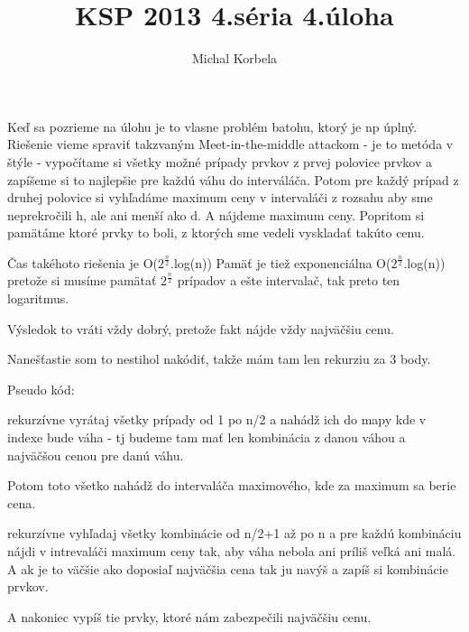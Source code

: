 \documentclass[a4paper,11pt]{article}
\title{KSP 2013 4.séria 4.úloha}
\author{Michal Korbela}
\begin{document}
Keď sa pozrieme na úlohu je to vlasne problém batohu, ktorý je np úplný.
Riešenie vieme spraviť takzvaným Meet-in-the-middle attackom - je to metóda v štýle - vypočítame si všetky možné prípady prvkov z prvej polovice prvkov a zapíšeme si to najlepšie pre každú váhu do interváláča. Potom pre každý prípad z druhej polovice si vyhľadáme maximum ceny v intervaláči z rozsahu aby sme neprekročili h, ale ani menší ako d.
A nájdeme maximum ceny. Popritom si pamätáme ktoré prvky to boli, z ktorých sme vedeli vyskladať takúto cenu.

Čas takéhoto riešenia je O($2^{\frac{n}{2}}$.log(n))
Pamäť je tiež exponenciálna O($2^{\frac{n}{2}}$.log(n)) pretože si musíme pamätať $2^{\frac{n}{2}}$ prípadov a ešte intervalač, tak preto ten logaritmus.

Výsledok to vráti vždy dobrý, pretože fakt nájde vždy najväčšiu cenu.

Nanešťastie som to nestihol nakódiť, takže mám tam len rekurziu za 3 body.

Pseudo kód:

rekurzívne vyrátaj všetky prípady od 1 po n/2 a nahádž ich do mapy kde v indexe bude váha - tj budeme tam mať len kombinácia z danou váhou a najväčšou cenou pre danú váhu.

Potom toto všetko nahádž do intervaláča maximového, kde za maximum sa berie cena.

rekurzívne vyhľadaj všetky kombinácie od n/2+1 až po n a pre každú kombináciu nájdi v intrevaláči maximum ceny tak, aby váha nebola ani príliš veľká ani malá.
A ak je to väčšie ako doposiaľ najväčšia cena tak ju navýš a zapíš si kombinácie prvkov.

A nakoniec vypíš tie prvky, ktoré nám zabezpečili najväčšiu cenu.

 
\end{document}
